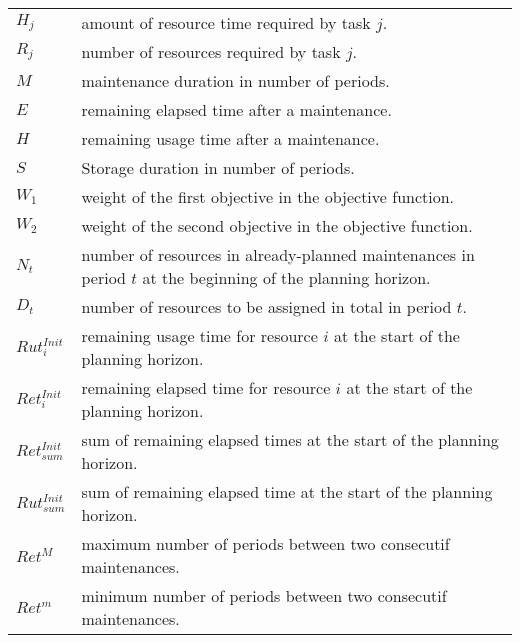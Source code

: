\documentclass[a4paper,onecolumn,fleqn]{article}
\begin{document}
    \begin{tabular}{p{8mm}p{167mm}}
        $H_j$             & amount of resource time required by task $j$. \\
        $R_j$             & number of resources required by task $j$. \\
        $M$               & maintenance duration in number of periods. \\
        $E$               & remaining elapsed time after a maintenance. \\
        $H$               & remaining usage time after a maintenance. \\
        $S$               & Storage duration in number of periods. \\
        $W_1$             & weight of the first objective in the objective function. \\
        $W_2$             & weight of the second objective in the objective function. \\
        $N_t$             & number of resources in already-planned maintenances in period $t$ at the beginning of the planning horizon.\\
        $D_t$             & number of resources to be assigned in total in period $t$. \\
        $Rut^{Init}_{i}$  & remaining usage time for resource $i$ at the start of the planning horizon. \\
        $Ret^{Init}_{i}$  & remaining elapsed time for resource $i$ at the start of the planning horizon. \\
        $Ret^{Init}_{sum}$& sum of remaining elapsed times at the start of the planning horizon. \\
        $Rut^{Init}_{sum}$& sum of remaining elapsed time at the start of the planning horizon. \\
        $Ret^{M}$         & maximum number of periods between two consecutif maintenances. \\
        $Ret^{m}$         & minimum number of periods between two consecutif maintenances. \\
    \end{tabular}
\end{document}
